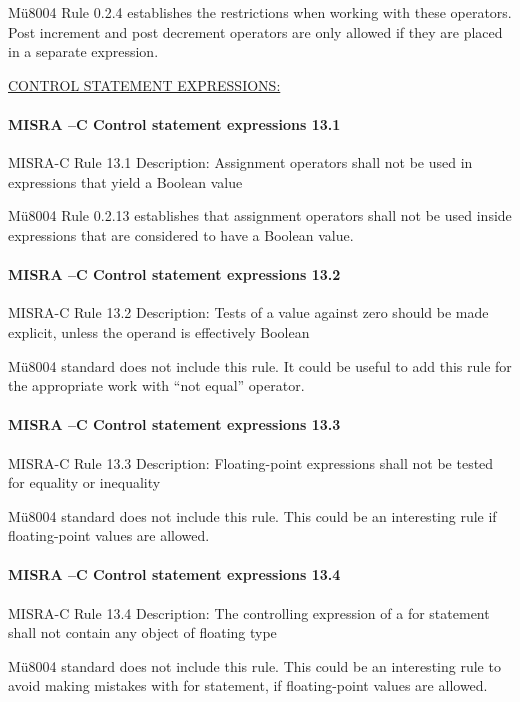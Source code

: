 Mü8004 Rule 0.2.4 establishes the restrictions when working with these operators. Post increment and post decrement operators are only allowed if they are placed in a separate expression.


\begin{center}
\textsc{\underline{CONTROL STATEMENT EXPRESSIONS:}}
\end{center}

\paragraph{MISRA –C Control statement expressions 13.1}
MISRA-C Rule 13.1 Description: Assignment operators shall not be used in expressions that yield a Boolean value

Mü8004 Rule 0.2.13 establishes that assignment operators shall not be used inside expressions that are considered to have a Boolean value.

\paragraph{MISRA –C Control statement expressions 13.2}
MISRA-C Rule 13.2 Description: Tests of a value against zero should be made explicit, unless the operand is effectively Boolean

Mü8004 standard does not include this rule. It could be useful to add this rule for the appropriate work with “not equal” operator.

\paragraph{MISRA –C Control statement expressions 13.3}
MISRA-C Rule 13.3 Description: Floating-point expressions shall not be tested for equality or inequality

Mü8004 standard does not include this rule. This could be an interesting rule if floating-point values are allowed.

\paragraph{MISRA –C Control statement expressions 13.4}
MISRA-C Rule 13.4 Description: The controlling expression of a for statement shall not contain any object of floating type

Mü8004 standard does not include this rule. This could be an interesting rule to avoid making mistakes with for statement, if floating-point values are allowed.

